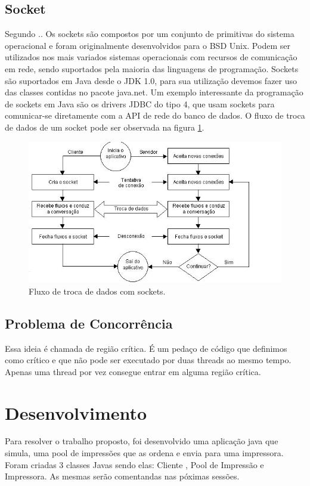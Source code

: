 \documentclass[12pt]{article}
\begin{document}
\subsection{Socket}
 Segundo \cite{socket}.\cite{conc}.
 Os sockets são compostos por um conjunto de primitivas do sistema operacional e foram originalmente desenvolvidos para o BSD Unix. Podem ser utilizados nos mais variados sistemas operacionais com recursos de comunicação em rede, sendo suportados pela maioria das linguagens de programação. Sockets são suportados em Java desde o JDK 1.0, para sua utilização devemos fazer uso das classes contidas no pacote java.net. Um exemplo interessante da programação de sockets em Java são os drivers JDBC do tipo 4, que usam sockets para comunicar-se diretamente com a API de rede do banco de dados. O fluxo de troca de dados de um socket pode ser observada na figura \ref{fluxoSocket}.
\begin{figure}[H]
	\centering
	\includegraphics[scale=1]{imagens/fluxoSocket.JPG}
    \caption{Fluxo de troca de dados com sockets.}
	\label{fluxoSocket}
\end{figure}

 \subsection{Problema de Concorrência}
Essa ideia é chamada de região crítica. É um pedaço de código que definimos como crítico e que não pode ser executado por duas threads ao mesmo tempo. Apenas uma thread por vez consegue entrar em alguma região crítica.

\section{Desenvolvimento}
Para resolver o trabalho proposto, foi desenvolvido uma aplicação java que simula, uma pool de impressões que as ordena e envia para uma impressora.
	Foram criadas 3 classes Javas sendo elas: Cliente , Pool de Impressão e Impressora.
	 As mesmas serão comentandas nas póximas sessões.
\end{document}
